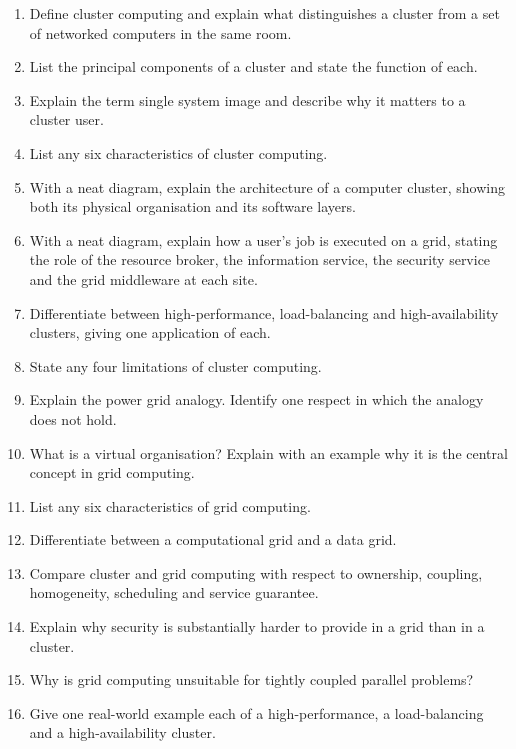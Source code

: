 \documentclass[../main.tex]{subfiles}
\begin{document}
\begin{enumerate}[label=\arabic*.]
  \item Define cluster computing and explain what distinguishes a cluster
        from a set of networked computers in the same room.
  \item List the principal components of a cluster and state the function of
        each.
  \item Explain the term single system image and describe why it matters to
        a cluster user.
  \item List any six characteristics of cluster computing.
  \item With a neat diagram, explain the architecture of a computer cluster,
        showing both its physical organisation and its software layers.
  \item With a neat diagram, explain how a user's job is executed on a grid,
        stating the role of the resource broker, the information service, the
        security service and the grid middleware at each site.
  \item Differentiate between high-performance, load-balancing and
        high-availability clusters, giving one application of each.
  \item State any four limitations of cluster computing.
  \item Explain the power grid analogy. Identify one respect in which the
        analogy does not hold.
  \item What is a virtual organisation? Explain with an example why it is the
        central concept in grid computing.
  \item List any six characteristics of grid computing.
  \item Differentiate between a computational grid and a data grid.
  \item Compare cluster and grid computing with respect to ownership,
        coupling, homogeneity, scheduling and service guarantee.
  \item Explain why security is substantially harder to provide in a grid
        than in a cluster.
  \item Why is grid computing unsuitable for tightly coupled parallel
        problems?
  \item Give one real-world example each of a high-performance, a
        load-balancing and a high-availability cluster.

\end{enumerate}

\end{document}
